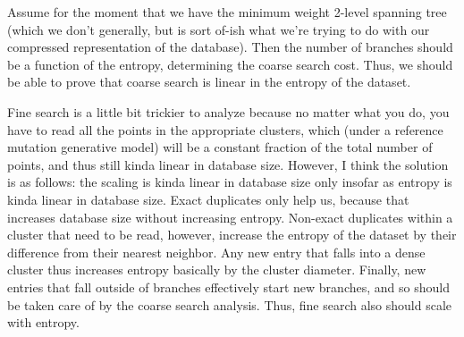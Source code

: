 \documentclass{amsart}
\theoremstyle{definition}
\theoremstyle{remark}
\numberwithin{equation}{section}
\begin{document}
Assume for the moment that we have the minimum weight 2-level spanning
tree (which we don't generally, but is sort of-ish what we're trying to
do with our compressed representation of the database).  Then the number
of branches should be a function of the entropy, determining the coarse
search cost. Thus, we should be able to prove that coarse search is
linear in the entropy of the dataset.

Fine search is a little bit trickier to analyze because no matter what
you do, you have to read all the points in the appropriate clusters,
which (under a reference mutation generative model) will be a constant
fraction of the total number of points, and thus still kinda linear in
database size. However, I think the solution is as follows: the scaling
is kinda linear in database size only insofar as entropy is kinda linear
in database size. Exact duplicates only help us, because that increases
database size without increasing entropy. Non-exact duplicates within a
cluster that need to be read, however, increase the entropy of the
dataset by their difference from their nearest neighbor. Any new entry
that falls into a dense cluster thus increases entropy basically by the
cluster diameter. Finally, new entries that fall outside of branches
effectively start new branches, and so should be taken care of by the
coarse search analysis. Thus, fine search also should scale with
entropy.




\end{document}
